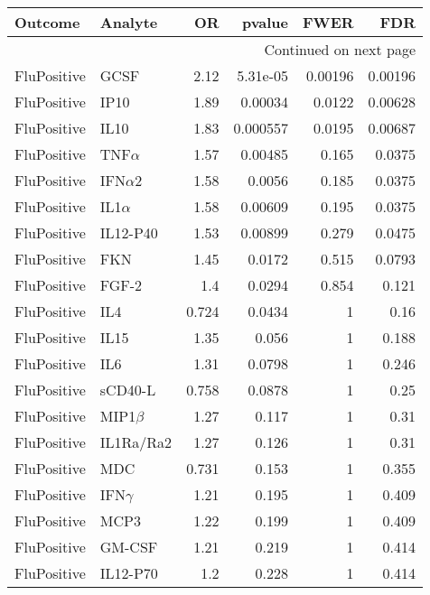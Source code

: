 \documentclass[10pt]{article}
\begin{document}
\begin{longtable}{llrrrr}
\toprule
     Outcome &       Analyte &    OR &   pvalue &    FWER &     FDR \\
\midrule
\endhead
\midrule
\multicolumn{6}{r}{{Continued on next page}} \\
\midrule
\endfoot

\bottomrule
\endlastfoot
 FluPositive &          GCSF &  2.12 & 5.31e-05 & 0.00196 & 0.00196 \\
 FluPositive &          IP10 &  1.89 &  0.00034 &  0.0122 & 0.00628 \\
 FluPositive &          IL10 &  1.83 & 0.000557 &  0.0195 & 0.00687 \\
 FluPositive &   TNF$\alpha$ &  1.57 &  0.00485 &   0.165 &  0.0375 \\
 FluPositive &  IFN$\alpha$2 &  1.58 &   0.0056 &   0.185 &  0.0375 \\
 FluPositive &   IL1$\alpha$ &  1.58 &  0.00609 &   0.195 &  0.0375 \\
 FluPositive &      IL12-P40 &  1.53 &  0.00899 &   0.279 &  0.0475 \\
 FluPositive &           FKN &  1.45 &   0.0172 &   0.515 &  0.0793 \\
 FluPositive &         FGF-2 &   1.4 &   0.0294 &   0.854 &   0.121 \\
 FluPositive &           IL4 & 0.724 &   0.0434 &       1 &    0.16 \\
 FluPositive &          IL15 &  1.35 &    0.056 &       1 &   0.188 \\
 FluPositive &           IL6 &  1.31 &   0.0798 &       1 &   0.246 \\
 FluPositive &       sCD40-L & 0.758 &   0.0878 &       1 &    0.25 \\
 FluPositive &   MIP1$\beta$ &  1.27 &    0.117 &       1 &    0.31 \\
 FluPositive &     IL1Ra/Ra2 &  1.27 &    0.126 &       1 &    0.31 \\
 FluPositive &           MDC & 0.731 &    0.153 &       1 &   0.355 \\
 FluPositive &   IFN$\gamma$ &  1.21 &    0.195 &       1 &   0.409 \\
 FluPositive &          MCP3 &  1.22 &    0.199 &       1 &   0.409 \\
 FluPositive &        GM-CSF &  1.21 &    0.219 &       1 &   0.414 \\
 FluPositive &      IL12-P70 &   1.2 &    0.228 &       1 &   0.414 \\

\end{longtable}
\end{document}
